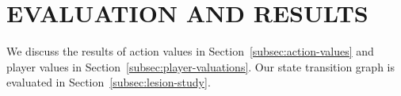 \documentclass[]{article}
\begin{document}






\section{EVALUATION AND RESULTS}

We discuss the results of action values in Section~\ref{subsec:action-values} and player values in Section~\ref{subsec:player-valuations}. Our state transition graph is evaluated in Section~\ref{subsec:lesion-study}.

\end{document}
